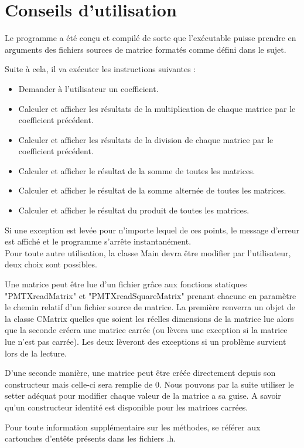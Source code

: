 	\chapter{Conseils d'utilisation}%
	Le programme a été conçu et compilé de sorte que l'exécutable puisse prendre en arguments des fichiers sources de matrice formatés comme défini dans le sujet.
	
	Suite à cela, il va exécuter les instructions suivantes :
	\begin{itemize}
		\item Demander à l'utilisateur un coefficient.
		\item Calculer et afficher les résultats de la multiplication de chaque matrice par le coefficient précédent.
		\item Calculer et afficher les résultats de la division de chaque matrice par le coefficient précédent.
		\item Calculer et afficher le résultat de la somme de toutes les matrices.
		\item Calculer et afficher le résultat de la somme alternée de toutes les matrices.
		\item Calculer et afficher le résultat du produit de toutes les matrices. \\
	\end{itemize}
	Si une exception est levée pour n'importe lequel de ces points, le message d'erreur est affiché et le programme s'arrête instantanément.\\
	
	Pour toute autre utilisation, la classe Main devra être modifier par l'utilisateur, deux choix sont possibles.
	
	Une matrice peut être lue d'un fichier grâce aux fonctions statiques "PMTXreadMatrix" et "PMTXreadSquareMatrix" prenant chacune en paramètre le chemin relatif d'un fichier source de matrice. La première renverra un objet de la classe CMatrix quelles que soient les réelles dimensions de la matrice lue alors que la seconde créera une matrice carrée (ou lèvera une exception si la matrice lue n'est pas carrée). Les deux lèveront des exceptions si un problème survient lors de la lecture.
	
	D'une seconde manière, une matrice peut être créée directement depuis son constructeur mais celle-ci sera remplie de 0. Nous pouvons par la suite utiliser le setter adéquat pour modifier chaque valeur de la matrice a sa guise. A savoir qu'un constructeur identité est disponible pour les matrices carrées.

	Pour toute information supplémentaire sur les méthodes, se référer aux cartouches d'entête présents dans les fichiers .h.

